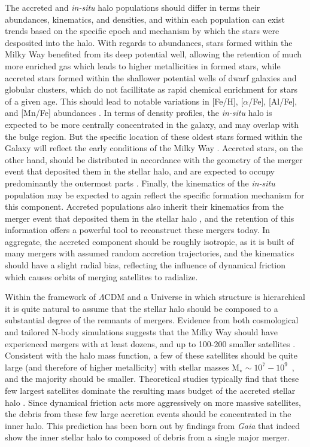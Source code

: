 The accreted and \textit{in-situ} halo populations should differ in terms their abundances, kinematics, and densities, and within each population can exist trends based on the specific epoch and mechanism by which the stars were desposited into the halo. With regards to abundances, stars formed within the Milky Way benefited from its deep potential well, allowing the retention of much more enriched gas which leads to higher metallicities in formed stars, while accreted stars formed within the shallower potential wells of dwarf galaxies and globular clusters, which do not facillitate as rapid chemical enrichment for stars of a given age. This should lead to notable variations in [Fe/H], [$\alpha$/Fe], [Al/Fe], and [Mn/Fe] abundances \parencite{tumlinson10,zolotov10,hawkins15}. In terms of density profiles, the \textit{in-situ} halo is expected to be more centrally concentrated in the galaxy, and may overlap with the bulge region. But the specific location of these oldest stars formed within the Galaxy will reflect the early conditions of the Milky Way \parencite[e.g.][]{el-badry18}. Accreted stars, on the other hand, should be distributed in accordance with the geometry of the merger event that deposited them in the stellar halo, and are expected to occupy predominantly the outermost parts \parencite{abadi06}. Finally, the kinematics of the \textit{in-situ} population may be expected to again reflect the specific formation mechanism for this component. Accreted populations also inherit their kinematics from the merger event that deposited them in the stellar halo \parencite{bullock05,johnston08,cooper10}, and the retention of this information offers a powerful tool to reconstruct these mergers today. In aggregate, the accreted component should be roughly isotropic, as it is built of many mergers with assumed random accretion trajectories, and the kinematics should have a slight radial bias, reflecting the influence of dynamical friction which causes orbits of merging satellites to radialize.

Within the framework of $\Lambda$CDM and a Universe in which structure is hierarchical it is quite natural to assume that the stellar halo should be composed to a substantial degree of the remnants of mergers. Evidence from both cosmological and tailored N-body simulations suggests that the Milky Way should have experienced mergers with at least dozens, and up to 100-200 smaller satellites \parencite{abadi06,fakhouri10,font11,pillepich14}. Consistent with the halo mass function, a few of these satellites should be quite large (and therefore of higher metallicity) with stellar masses M$_{\star} \sim 10^{7}-10^{9}$~\Msun, and the majority should be smaller. Theoretical studies typically find that these few largest satellites dominate the resulting mass budget of the accreted stellar halo \parencite{bullock05,delucia08,cooper10}. Since dynamical friction acts more aggressively on more massive satellites, the debris from these few large accretion events should be concentrated in the inner halo. This prediction has been born out by findings from \textit{Gaia} that indeed show the inner stellar halo to composed of debris from a single major merger.

